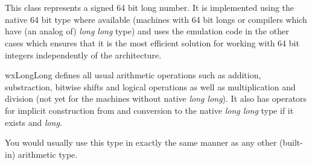 \section{}\label{wxlonglong}

This class represents a signed 64 bit long number. It is implemented using the
native 64 bit type where available (machines with 64 bit longs or compilers
which have (an analog of) {\it long long} type) and uses the emulation code in
the other cases which ensures that it is the most efficient solution for
working with 64 bit integers independently of the architecture.

wxLongLong defines all usual arithmetic operations such as addition,
substraction, bitwise shifts and logical operations as well as multiplication
and division (not yet for the machines without native {\it long long}). It
also has operators for implicit construction from and conversion to the native 
{\it long long} type if it exists and {\it long}.

You would usually use this type in exactly the same manner as any other
(built-in) arithmetic type.
